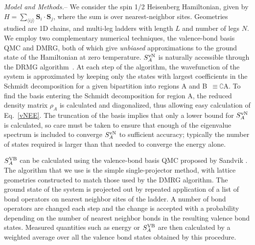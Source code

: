 \documentclass[prl,aps,twocolumn,floatfix,amsmath,amssymb,superscriptaddress,tightenlines]{revtex4}
\begin{document}
{\it Model and Methods.}-- We consider the spin 1/2 Heisenberg
Hamiltonian, given by  $H =  \sum_{\langle i j \rangle} {\mathbf S}_i
\cdot {\mathbf S}_j \label{ham}$, where the sum is over nearest-neighbor
sites.  Geometries studied are 1D chains, and multi-leg ladders with
length $L$ and number of legs $N$.  
We employ two complementary numerical techniques, the valence-bond basis QMC and DMRG, both of
which give {\it unbiased} approximations to the ground state of the
Hamiltonian at zero temperature.  $S^{ \rm vN}_A$ is naturally accessible
through the DRMG 
algorithm~\cite{White92}.  At each
step of the algorithm, the wavefunction of the system is approximated by
keeping only the states with largest coefficients in the Schmidt
decomposition for a given bipartition into regions A and
B~$\equiv\complement$A. To find the
basis entering the Schmidt decomposition for region A, the reduced
density matrix $\rho_A$ is calculated and diagonalized, thus allowing easy
calculation of Eq.~\eqref{vNEE}. The truncation of the basis implies that
only a lower bound for $S^{\rm vN}_A$ is calculated, so care must be taken
to ensure that enough of the eigenvalue spectrum is included to converge
$S^{ \rm vN}_A$ to sufficient accuracy; typically the number of states required
is larger than that needed to converge the energy alone.

$S^{\rm VB}_A$ \cite{Alet,Chh} can be calculated using the valence-bond basis
QMC proposed by Sandvik \cite{Sandvik}.  The 
algorithm that we use is the simple single-projector method, with lattice
geometries constructed to match those used by the DMRG algorithm.  The
ground state of the system is projected out by repeated application of a
list of bond operators on nearest neighbor sites of the ladder.  A number
of bond operators are changed each step and the change is accepted
with a probability depending on the number of nearest neighbor bonds in
the resulting valence bond states. Measured quantities such as energy or
$S^{\rm VB}_A$ are then calculated by a weighted average over all the valence bond
states obtained by this procedure.
\end{document}
